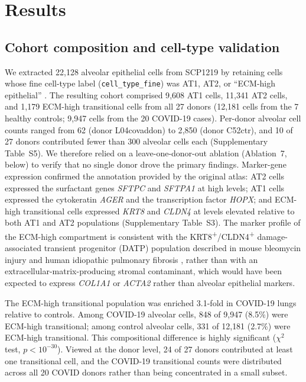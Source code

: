 \documentclass[11pt]{article}
\begin{document}
\section{Results}

\subsection{Cohort composition and cell-type validation}

We extracted 22{,}128 alveolar epithelial cells from SCP1219 by retaining cells whose fine cell-type label (\texttt{cell\_type\_fine}) was AT1, AT2, or ``ECM-high epithelial'' \citep{Melms2021}. The resulting cohort comprised 9{,}608 AT1 cells, 11{,}341 AT2 cells, and 1{,}179 ECM-high transitional cells from all 27 donors (12{,}181 cells from the 7 healthy controls; 9{,}947 cells from the 20 COVID-19 cases). Per-donor alveolar cell counts ranged from 62 (donor L04covaddon) to 2{,}850 (donor C52ctr), and 10 of 27 donors contributed fewer than 300 alveolar cells each (Supplementary Table~S5). We therefore relied on a leave-one-donor-out ablation (Ablation~7, below) to verify that no single donor drove the primary findings. Marker-gene expression confirmed the annotation provided by the original atlas: AT2 cells expressed the surfactant genes \textit{SFTPC} and \textit{SFTPA1} at high levels; AT1 cells expressed the cytokeratin \textit{AGER} and the transcription factor \textit{HOPX}; and ECM-high transitional cells expressed \textit{KRT8} and \textit{CLDN4} at levels elevated relative to both AT1 and AT2 populations (Supplementary Table~S3). The marker profile of the ECM-high compartment is consistent with the KRT8\textsuperscript{+}/CLDN4\textsuperscript{+} damage-associated transient progenitor (DATP) population described in mouse bleomycin injury and human idiopathic pulmonary fibrosis \citep{Kobayashi2020, Strunz2020, Adams2020, Habermann2020}, rather than with an extracellular-matrix-producing stromal contaminant, which would have been expected to express \textit{COL1A1} or \textit{ACTA2} rather than alveolar epithelial markers.

The ECM-high transitional population was enriched 3.1-fold in COVID-19 lungs relative to controls. Among COVID-19 alveolar cells, 848 of 9{,}947 (8.5\%) were ECM-high transitional; among control alveolar cells, 331 of 12{,}181 (2.7\%) were ECM-high transitional. This compositional difference is highly significant ($\chi^2$ test, $p < 10^{-30}$). Viewed at the donor level, 24 of 27 donors contributed at least one transitional cell, and the COVID-19 transitional counts were distributed across all 20 COVID donors rather than being concentrated in a small subset.
\end{document}

